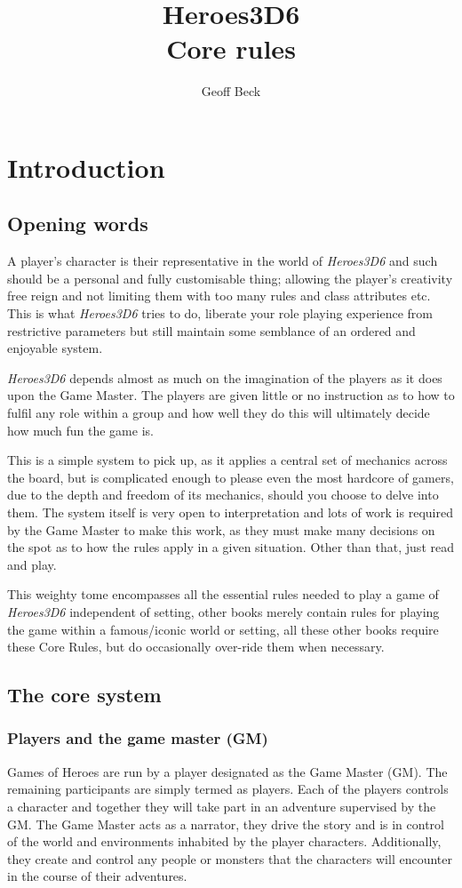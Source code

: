 \documentclass[a4paper,10pt,oneside]{book}
\title{\textbf{\huge Heroes3D6\\Core rules}}
\author{Geoff Beck}
\date{}
\begin{document}
\frontmatter
\maketitle
\tableofcontents
\mainmatter

\chapter{Introduction}

\section{Opening words}
A player's character is their representative in the world of \textit{Heroes3D6} and such should be a personal and fully customisable thing; allowing the player's creativity free reign and not limiting them with too many rules and class attributes etc. This is what \textit{Heroes3D6} tries to do, liberate your role playing experience from restrictive parameters but still maintain some semblance of an ordered and enjoyable system.

\textit{Heroes3D6} depends almost as much on the imagination of the players as it does upon the Game Master. The players are given little or no instruction as to how to fulfil any role within a group and how well they do this will ultimately decide how much fun the game is.

This is a simple system to pick up, as it applies a central set of mechanics across the board, but is complicated enough to please even the most hardcore of gamers, due to the depth and freedom of its mechanics, should you choose to delve into them. The system itself is very open to interpretation and lots of work is required by the Game Master to make this work, as they must make many decisions on the spot as to how the rules apply in a given situation. Other than that, just read and play.

This weighty tome encompasses all the essential rules needed to play a game of \textit{Heroes3D6} independent of setting, other books merely contain rules for playing the game within a famous/iconic world or setting, all these other books require these Core Rules, but do occasionally over-ride them when necessary.

\section{The core system}
\label{sec:base}

\subsection{Players and the game master (GM)}
Games of Heroes are run by a player designated as the Game Master (GM). The remaining participants are simply termed as players. Each of the players controls a character and together they will take part in an adventure supervised by the GM. The Game Master acts as a narrator, they drive the story and is in control of the world and environments inhabited by the player characters. Additionally, they create and control any people or monsters that the characters will encounter in the course of their adventures. 
\end{document}
